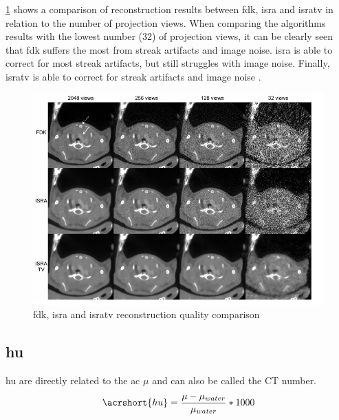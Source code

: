 \noindent
\cref{fig:alg-comp} shows a comparison of reconstruction results between \gls{fdk}, \gls{isra} and \gls{isratv}
in relation to the number of projection views.
When comparing the algorithms results with the lowest number (32) of projection views,
it can be clearly seen that \gls{fdk} suffers the most from streak artifacts and image noise.
\gls{isra} is able to correct for most streak artifacts, but still struggles with image noise.
Finally, \gls{isratv} is able to correct for streak artifacts and image noise \cite{vandeghinsteLowDoseMicroCTImaging2013}.
\begin{figure}[h]
	\centerline{
		\includegraphics[scale=0.5]{images/alg-comp.png}}
	\caption{\gls{fdk}, \gls{isra} and \gls{isratv} reconstruction quality comparison \cite{vandeghinsteLowDoseMicroCTImaging2013}}\label{fig:alg-comp}
\end{figure}


\subsection{\acrfull{hu}}\label{s:b-hu}
\acrfull{hu} are directly related to the \acrfull{ac} $\mu$
and can also be called the CT number.
\begin{equation}
	\acrshort{hu} = \frac{\mu - \mu_{water}}{\mu_{water}}*1000
\end{equation}\label{eqn:hu}

